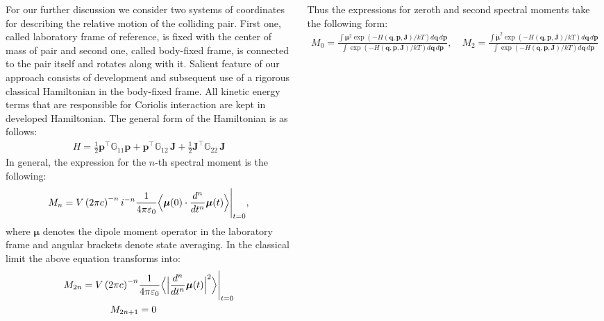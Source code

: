 \documentclass[
  20pt,
  a0paper,
  portrait,
  margin=0mm,
  innermargin=15mm,
  blockverticalspace=0mm,
  colspace=0mm,
  subcolspace=0mm
]{tikzposter}
\newcommand{\mf}{\mathbf}
\newcommand{\lb}{\left(}
\newcommand{\rb}{\right)}
\newcommand{\bbG}{\mathbb{G}}
\newcommand{\vpravo}{\hspace{1.5cm}}
\newcommand{\vverh}{\vspace*{-0.05cm}}
\begin{document}
\begin{columns}
{{\vpravo For our further discussion we consider two systems of coordinates for describing the relative motion of the colliding pair. First one, called laboratory frame of reference, is fixed with the center of mass of pair and second one, called body-fixed frame, is connected to the pair itself and rotates along with it. Salient feature of our approach consists of development and subsequent use of a rigorous classical Hamiltonian in the body-fixed frame. All kinetic energy terms that are responsible for Coriolis interaction are kept in developed Hamiltonian. The general form of the Hamiltonian is as follows: 
\vverh
\begin{gather}
		H = \frac{1}{2} \mf{p}^\top \bbG_{11} \mf{p} + \mf{p}^\top \bbG_{12} \, \mf{J} + \frac{1}{2} \mf{J}^\top \bbG_{22} \, \mf{J} \label{eq:hamiltonian}
\end{gather}
In general, the expression for the $n$-th spectral moment is the following: 
\vverh
\begin{gather}
		M_n = V \lb 2 \pi c \rb^{-n} i^{-n} \frac{1}{4 \pi \varepsilon_0} \Big\langle \boldsymbol{\mu}(0) \cdot \frac{d^n}{dt^n} \boldsymbol{\mu}(t) \Big\rangle \Bigg{|}_{t = 0}, \label{eq:general_moment}
\end{gather}
where $\boldsymbol{\mu}$ denotes the dipole moment operator in the laboratory frame and angular brackets denote state averaging. In the classical limit the above equation transforms into: 
\vspace*{-0.6cm}
\begin{gather}
\begin{aligned}
		M_{2n} = V \lb 2 \pi c \rb^{-n} & \frac{1}{4 \pi \varepsilon_0} \Big\langle \Big{|} \frac{d^n}{dt^n} \boldsymbol{\mu}(t) \Big{|}^2 \Big\rangle \Bigg{|}_{t = 0} \\
M_{2n + 1} &= 0
\end{aligned}
\label{eq:classical_moment}
\end{gather}

Thus the expressions for zeroth and second spectral moments take the following form:
\begin{gather}
		M_0 = \displaystyle \frac{\int \boldsymbol{\mu}^2 \exp \lb -H \lb \mf{q}, \mf{p}, \mf{J} \rb / k T \rb d \mf{q} \, d \mf{p}}{\int \exp \lb - H \lb \mf{q}, \mf{p}, \mf{J} \rb / k T \rb d \mf{q} \, d \mf{p}}, \quad M_2 = \displaystyle \frac{\int \boldsymbol{\dot{\mu}}^2 \exp \lb -H \lb \mf{q}, \mf{p}, \mf{J} \rb / k T \rb d \mf{q} \, d \mf{p}}{\int \exp \lb - H \lb \mf{q}, \mf{p}, \mf{J} \rb / k T \rb d \mf{q} \, d \mf{p}} \label{eq:m0_and_m2} 
\end{gather}

}}
\end{columns}
\end{document}
